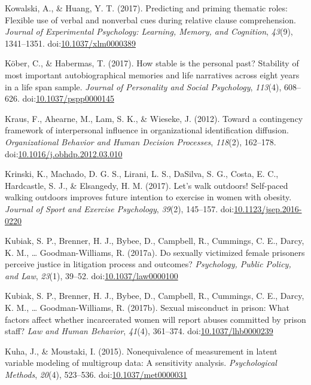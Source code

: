\documentclass[english,man]{apa6}
\theoremstyle{definition}
\theoremstyle{definition}
\theoremstyle{definition}
\theoremstyle{remark}
\begin{document}
\hypertarget{ref-Kowalski2017}{}
Kowalski, A., \& Huang, Y. T. (2017). Predicting and priming thematic
roles: Flexible use of verbal and nonverbal cues during relative clause
comprehension. \emph{Journal of Experimental Psychology: Learning,
Memory, and Cognition}, \emph{43}(9), 1341--1351.
doi:\href{https://doi.org/10.1037/xlm0000389}{10.1037/xlm0000389}

\hypertarget{ref-Kober2017}{}
Köber, C., \& Habermas, T. (2017). How stable is the personal past?
Stability of most important autobiographical memories and life
narratives across eight years in a life span sample. \emph{Journal of
Personality and Social Psychology}, \emph{113}(4), 608--626.
doi:\href{https://doi.org/10.1037/pspp0000145}{10.1037/pspp0000145}

\hypertarget{ref-Kraus2012}{}
Kraus, F., Ahearne, M., Lam, S. K., \& Wieseke, J. (2012). Toward a
contingency framework of interpersonal influence in organizational
identification diffusion. \emph{Organizational Behavior and Human
Decision Processes}, \emph{118}(2), 162--178.
doi:\href{https://doi.org/10.1016/j.obhdp.2012.03.010}{10.1016/j.obhdp.2012.03.010}

\hypertarget{ref-Krinski2017}{}
Krinski, K., Machado, D. G. S., Lirani, L. S., DaSilva, S. G., Costa, E.
C., Hardcastle, S. J., \& Elsangedy, H. M. (2017). Let's walk outdoors!
Self-paced walking outdoors improves future intention to exercise in
women with obesity. \emph{Journal of Sport and Exercise Psychology},
\emph{39}(2), 145--157.
doi:\href{https://doi.org/10.1123/jsep.2016-0220}{10.1123/jsep.2016-0220}

\hypertarget{ref-Kubiak2017a}{}
Kubiak, S. P., Brenner, H. J., Bybee, D., Campbell, R., Cummings, C. E.,
Darcy, K. M., \ldots{} Goodman-Williams, R. (2017a). Do sexually
victimized female prisoners perceive justice in litigation process and
outcomes? \emph{Psychology, Public Policy, and Law}, \emph{23}(1),
39--52.
doi:\href{https://doi.org/10.1037/law0000100}{10.1037/law0000100}

\hypertarget{ref-Kubiak2017}{}
Kubiak, S. P., Brenner, H. J., Bybee, D., Campbell, R., Cummings, C. E.,
Darcy, K. M., \ldots{} Goodman-Williams, R. (2017b). Sexual misconduct
in prison: What factors affect whether incarcerated women will report
abuses committed by prison staff? \emph{Law and Human Behavior},
\emph{41}(4), 361--374.
doi:\href{https://doi.org/10.1037/lhb0000239}{10.1037/lhb0000239}

\hypertarget{ref-Kuha2015}{}
Kuha, J., \& Moustaki, I. (2015). Nonequivalence of measurement in
latent variable modeling of multigroup data: A sensitivity analysis.
\emph{Psychological Methods}, \emph{20}(4), 523--536.
doi:\href{https://doi.org/10.1037/met0000031}{10.1037/met0000031}
\end{document}

